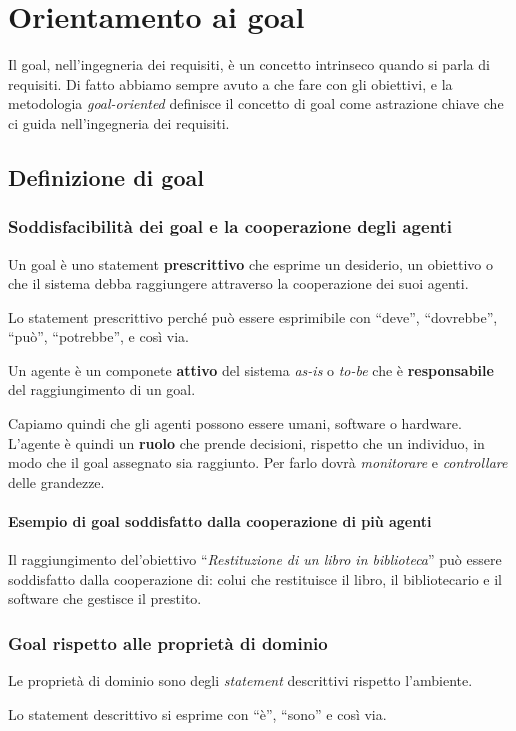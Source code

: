 \chapter{Orientamento ai goal}
Il goal, nell'ingegneria dei requisiti, è un concetto intrinseco quando 
si parla di requisiti.
Di fatto abbiamo sempre avuto a che fare con gli obiettivi, e la metodologia
\textit{goal-oriented} definisce il concetto di goal come astrazione chiave che 
ci guida nell'ingegneria dei requisiti.
\section{Definizione di goal}
\subsection{Soddisfacibilità dei goal e la cooperazione degli agenti}
\begin{tcolorbox}[colback=blue!5!white,colframe=blue!75!black, title=Goal]
  Un goal è uno statement \textbf{prescrittivo} che esprime un desiderio, un obiettivo o
  che il sistema debba raggiungere attraverso la cooperazione dei suoi agenti.
\end{tcolorbox}
Lo statement prescrittivo perché può essere esprimibile con ``deve'', ``dovrebbe'', 
``può'', ``potrebbe'', e così via.
\begin{tcolorbox}[colback=cyan!5!white,colframe=cyan!75!black, title=Agente]
    Un agente è un componete \textbf{attivo} del sistema \textit{as-is} o \textit{to-be} che è
    \textbf{responsabile} del raggiungimento
    di un goal.
\end{tcolorbox}
Capiamo quindi che gli agenti possono essere umani, software o hardware. L'agente è quindi 
un \textbf{ruolo} che prende decisioni, rispetto che un individuo, in modo che il goal assegnato sia raggiunto.
Per farlo dovrà \textit{monitorare} e \textit{controllare} delle grandezze.
\subsubsection{Esempio di goal soddisfatto dalla cooperazione di più agenti}
Il raggiungimento del'obiettivo ``\textit{Restituzione di un libro in biblioteca}''
può essere soddisfatto dalla cooperazione di: colui che restituisce il libro, 
il bibliotecario e il software che gestisce il prestito.
\subsection{Goal rispetto alle proprietà di dominio}
\begin{tcolorbox}[colback=violet!5!white,colframe=violet!75!black, title=Proprietà di Dominio]
    Le proprietà di dominio sono degli \textit{statement} descrittivi rispetto 
    l'ambiente.
\end{tcolorbox}
Lo statement descrittivo si esprime con ``è'', ``sono'' e così via.

